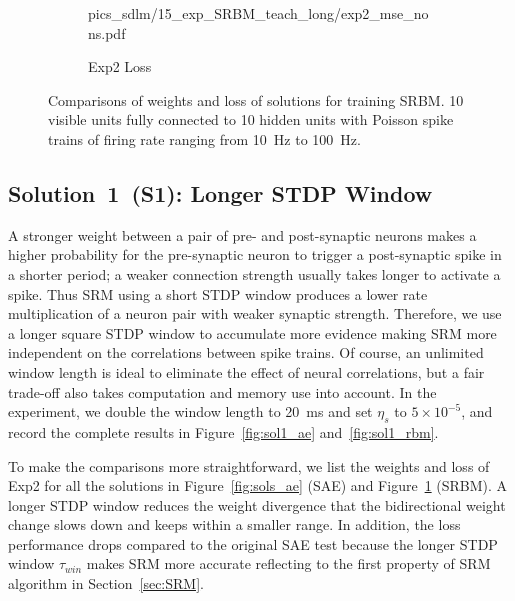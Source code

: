 \begin{figure}
\begin{subfigure}[c]{0.45\textwidth}
{			{pics_sdlm/15_exp_SRBM_teach_long/exp2_mse_nons.pdf}}\\
		\caption{Exp2 Loss}
	\end{subfigure}%
	\caption{Comparisons of weights and loss of solutions for training SRBM. 10 visible units fully connected to 10 hidden units with Poisson spike trains of firing rate ranging from 10~Hz to 100~Hz.}
	\label{fig:sols_rbm}
\end{figure}

\subsection{Solution~1~(S1): Longer STDP Window}
A stronger weight between a pair of pre- and post-synaptic neurons makes a higher probability for the pre-synaptic neuron to trigger a post-synaptic spike in a shorter period; 
a weaker connection strength usually takes longer to activate a spike.
Thus SRM using a short STDP window produces a lower rate multiplication of a neuron pair with weaker synaptic strength.
Therefore, we use a longer square STDP window to accumulate more evidence making SRM more independent on the correlations between spike trains.
Of course, an unlimited window length is ideal to eliminate the effect of neural correlations, but a fair trade-off also takes computation and memory use into account.
In the experiment, we double the window length to 20~ms and set $\eta_s$ to $5 \times 10^{-5}$, and record the complete results in Figure~\ref{fig:sol1_ae} and~\ref{fig:sol1_rbm}.

To make the comparisons more straightforward, we list the weights and loss of Exp2 for all the solutions in Figure~\ref{fig:sols_ae} (SAE) and Figure~\ref{fig:sols_rbm} (SRBM).
A longer STDP window reduces the weight divergence that the bidirectional weight change slows down and keeps within a smaller range.
In addition, the loss performance drops compared to the original SAE test because the longer STDP window $\tau_{win}$ makes SRM more accurate reflecting to the first property of SRM algorithm in Section~\ref{sec:SRM}.



